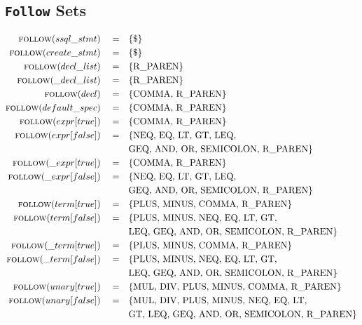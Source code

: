 \documentclass{article}
\begin{document}
\subsection{\texttt{Follow} Sets}
\begin{align*}
\textsc{follow}(ssql\_stmt)\quad =& \quad \{\text{\$}\} \\
\textsc{follow}(create\_stmt)\quad =& \quad \{\text{\$}\} \\
\textsc{follow}(decl\_list)\quad =& \quad \{\text{R\_PAREN}\} \\
\textsc{follow}(\_decl\_list)\quad =& \quad \{\text{R\_PAREN}\} \\
\textsc{follow}(decl)\quad =& \quad \{\text{COMMA, R\_PAREN}\} \\
\textsc{follow}(default\_spec)\quad =& \quad \{\text{COMMA, R\_PAREN}\} \\
\textsc{follow}(expr[true])\quad =& \quad \{\text{COMMA, R\_PAREN}\} \\
\textsc{follow}(expr[false])\quad =& \quad \{\text{NEQ, EQ, LT, GT, LEQ,}\\
 & \quad \text{GEQ, AND, OR, SEMICOLON, R\_PAREN}\} \\
\textsc{follow}(\_expr[true])\quad =& \quad \{\text{COMMA, R\_PAREN}\} \\
\textsc{follow}(\_expr[false])\quad =& \quad \{\text{NEQ, EQ, LT, GT, LEQ,}\\
& \quad \text{GEQ, AND, OR, SEMICOLON, R\_PAREN}\} \\
\textsc{follow}(term[true])\quad =& \quad \{\text{PLUS, MINUS, COMMA, R\_PAREN}\} \\
\textsc{follow}(term[false])\quad =& \quad \{\text{PLUS, MINUS, NEQ, EQ, LT, GT,}\\
& \quad \text{LEQ, GEQ, AND, OR, SEMICOLON, R\_PAREN}\} \\
\textsc{follow}(\_term[true])\quad =& \quad \{\text{PLUS, MINUS, COMMA, R\_PAREN}\} \\
\textsc{follow}(\_term[false])\quad =& \quad \{\text{PLUS, MINUS, NEQ, EQ, LT, GT,}\\
& \quad \text{LEQ, GEQ, AND, OR, SEMICOLON, R\_PAREN}\} \\
\textsc{follow}(unary[true])\quad =& \quad \{\text{MUL, DIV, PLUS, MINUS, COMMA, R\_PAREN}\} \\
\textsc{follow}(unary[false])\quad =& \quad \{\text{MUL, DIV, PLUS, MINUS, NEQ, EQ, LT,} \\
& \quad \text{GT, LEQ, GEQ, AND, OR, SEMICOLON, R\_PAREN}\} \\

\end{align*}
\end{document}
